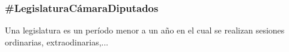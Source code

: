 \subsubsection{\#LegislaturaCámaraDiputados}

Una legislatura es un período menor a un año en el cual se realizan
sesiones ordinarias, extraodinarias,...

\begin{description}
  
\end{description}
